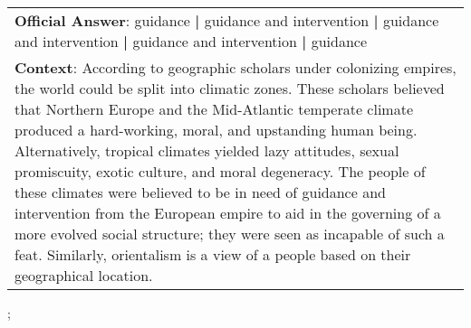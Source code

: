 \begin{figure*}[ht]
{\begin{tabular}{p{}}
            \textbf{Official Answer}: guidance \textbf{|} guidance and intervention \textbf{|} guidance and intervention \textbf{|} guidance and intervention \textbf{|} guidance                                                                                                                                                                                                                                                                                                                                                                                                                                                                                                                                   \\
            \textbf{Context}: According to geographic scholars under colonizing empires, the world could be split into climatic zones. These scholars believed that Northern Europe and the Mid-Atlantic temperate climate produced a hard-working, moral, and upstanding human being. Alternatively, tropical climates yielded lazy attitudes, sexual promiscuity, exotic culture, and moral degeneracy. The people of these climates were believed to be in need of guidance and intervention from the European empire to aid in the governing of a more evolved social structure; they were seen as incapable of such a feat. Similarly, orientalism is a view of a people based on their geographical location. \\
        \end{tabular}
    };
    \label{fig:ex-5730a314069b5314008321ed}
\end{figure*}

